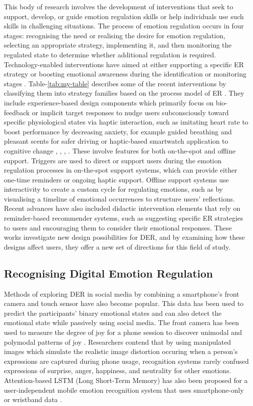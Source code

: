 This body of research involves the development of interventions that seek to support, develop, or guide emotion regulation skills or help individuals use such skills in challenging situations. The process of emotion regulation occurs in four stages: recognising the need or realising the desire for emotion regulation, selecting an appropriate strategy, implementing it, and then monitoring the regulated state to determine whether additional regulation is required. Technology-enabled interventions have aimed at either supporting a specific ER strategy or boosting emotional awareness during the identification or monitoring stages \cite{slovak2022designing}. 
Table-\ref{tab:my-table} describes some of the recent interventions by classifying them into strategy families based on the process model of ER \cite{wadley2020digital}.
They include experience-based design components which primarily focus on bio-feedback or implicit target responses to nudge users subconsciously toward specific physiological states via haptic interaction, such as imitating heart rate to boost performance by decreasing anxiety, for example guided breathing and pleasant scents for safer driving or haptic-based smartwatch application to cognitive change \cite{smith2022digital}, \cite{paredes2018just}, \cite{dmitrenko2020caroma}, \cite{costa2019boostmeup}. These involve features for both on-the-spot and offline support. Triggers are used to direct or support users during the emotion regulation processes in on-the-spot support systems, which can provide either one-time reminders or ongoing haptic support. Offline support systems use interactivity to create a custom cycle for regulating emotions, such as by visualising a timeline of emotional occurrences to structure users' reflections. Recent advances have also included didactic intervention elements that rely on reminder-based recommender systems, such as suggesting specific ER strategies to users and encouraging them to consider their emotional responses. These works investigate new design possibilities for DER, and by examining how these designs affect users, they offer a new set of directions for this field of study.
\vspace{-0.15cm}
\subsection{Recognising Digital Emotion Regulation}
Methods of exploring DER in social media by combining a smartphone's front camera and touch sensor have also become popular. This data has been used to predict the participants' binary emotional states and can also detect the emotional state while passively using social media. The front camera has been used to measure the degree of joy for a phone session to discover unimodal and polymodal patterns of joy \cite{tag2022emotion}. Researchers contend that by using manipulated images which simulate the realistic image distortion occuring when a person's expressions are captured during phone usage, recognition systems rarely confused expressions of surprise, anger, happiness, and neutrality for other emotions. Attention-based LSTM (Long Short-Term Memory) has also been proposed for a user-independent mobile emotion recognition system that uses smartphone-only or wristband data \cite{yang2021behavioral}.


